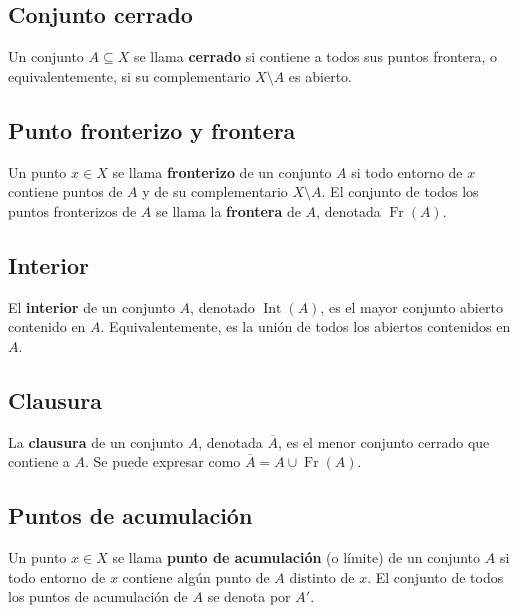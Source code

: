 \documentclass[12pt]{article}
\begin{document}
\subsection*{Conjunto cerrado}
\begin{tcolorbox}[definitionstyle]
Un conjunto \( A \subseteq X \) se llama \textbf{cerrado} si contiene a todos sus puntos frontera, o equivalentemente, si su complementario \( X \setminus A \) es abierto.
\end{tcolorbox}
\subsection*{Punto fronterizo y frontera}
\begin{tcolorbox}[definitionstyle]
Un punto \( x \in X \) se llama \textbf{fronterizo} de un conjunto \( A \) si todo entorno de \( x \) contiene puntos de \( A \) y de su complementario \( X \setminus A \).  
El conjunto de todos los puntos fronterizos de \( A \) se llama la \textbf{frontera} de \( A \), denotada \( \operatorname{Fr}(A) \).
\end{tcolorbox}
\subsection*{Interior}
\begin{tcolorbox}[definitionstyle]
 El \textbf{interior} de un conjunto \( A \), denotado \( \operatorname{Int}(A) \), es el mayor conjunto abierto contenido en \( A \).  
Equivalentemente, es la unión de todos los abiertos contenidos en \( A \).
\end{tcolorbox}
\subsection*{Clausura}
\begin{tcolorbox}[definitionstyle]
La \textbf{clausura} de un conjunto \( A \), denotada \( \overline{A} \), es el menor conjunto cerrado que contiene a \( A \).  
Se puede expresar como \( \overline{A} = A \cup \operatorname{Fr}(A) \).
\end{tcolorbox}
\subsection*{Puntos de acumulación}
\begin{tcolorbox}[definitionstyle]
Un punto \( x \in X \) se llama \textbf{punto de acumulación} (o límite) de un conjunto \( A \) si todo entorno de \( x \) contiene algún punto de \( A \) distinto de \( x \).  
El conjunto de todos los puntos de acumulación de \( A \) se denota por \( A' \).
\end{tcolorbox}
\end{document}
